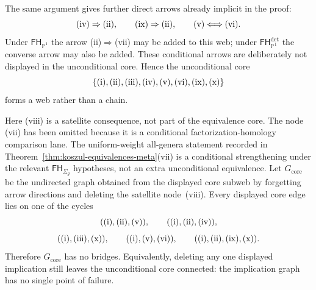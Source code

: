 \begin{remark}
\smallskip\noindent
The same argument gives further direct arrows already implicit in
the proof:
\[
\textup{(iv)} \Rightarrow \textup{(ii)},\qquad
\textup{(ix)} \Rightarrow \textup{(ii)},\qquad
\textup{(v)} \Longleftrightarrow \textup{(vi)}.
\]
Under $\mathsf{FH}_{\mathbb{P}^1}$ the arrow
\textup{(ii)}$\Rightarrow$\textup{(vii)} may be added to this web;
under $\mathsf{FH}^{\mathrm{det}}_{\mathbb{P}^1}$ the converse
arrow may also be added. These conditional arrows are deliberately
not displayed in the unconditional core.
Hence the unconditional core
\[
\{\textup{(i)},\textup{(ii)},\textup{(iii)},\textup{(iv)},
\textup{(v)},\textup{(vi)},\textup{(ix)},
\textup{(x)}\}
\]
forms a web rather than a chain.

\begin{center}
\end{center}

Here \textup{(viii)} is a satellite consequence, not part of the
equivalence core.
The node \textup{(vii)} has been omitted because it is a conditional
factorization-homology comparison lane. The uniform-weight all-genera
statement recorded in
Theorem~\ref{thm:koszul-equivalences-meta}\textup{(vii)} is a
conditional strengthening under the relevant
$\mathsf{FH}_{\Sigma_g}$ hypotheses, not an extra unconditional
equivalence.
Let $G_{\mathrm{core}}$ be the undirected graph obtained from the
displayed core subweb by forgetting arrow directions and deleting the
satellite node~\textup{(viii)}.
Every displayed core edge lies on one of the cycles
\[
(\textup{(i)},\textup{(ii)},\textup{(v)}),\qquad
(\textup{(i)},\textup{(ii)},\textup{(iv)}),
\]
\[
(\textup{(i)},\textup{(iii)},\textup{(x)}),\qquad
(\textup{(i)},\textup{(v)},\textup{(vi)}),\qquad
(\textup{(i)},\textup{(ii)},\textup{(ix)},\textup{(x)}).
\]
Therefore $G_{\mathrm{core}}$ has no bridges.
Equivalently, deleting any one displayed implication still leaves the
unconditional core connected: the implication graph has no single
point of failure.
\end{remark}

